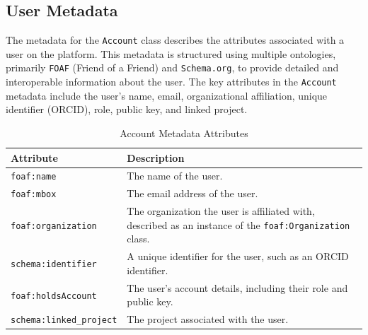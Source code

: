 \documentclass[final]{rc-book-2.14}
\begin{document}
\subsection{User Metadata}

The metadata for the \texttt{Account} class describes the attributes associated with a user on the platform. This metadata is structured using multiple ontologies, primarily \texttt{FOAF} (Friend of a Friend) and \texttt{Schema.org}, to provide detailed and interoperable information about the user. The key attributes in the \texttt{Account} metadata include the user's name, email, organizational affiliation, unique identifier (ORCID), role, public key, and linked project.

\begin{table}[h]
    \centering
    \renewcommand{\arraystretch}{1.2}
    \begin{tabularx}{\textwidth}{|l|X|}
        \hline
        \textbf{Attribute}              & \textbf{Description}                                                                                            \\ \hline
        \texttt{foaf:name}              & The name of the user.                                                                                           \\ \hline
        \texttt{foaf:mbox}              & The email address of the user.                                                                                  \\ \hline
        \texttt{foaf:organization}      & The organization the user is affiliated with, described as an instance of the \texttt{foaf:Organization} class. \\ \hline
        \texttt{schema:identifier}      & A unique identifier for the user, such as an ORCID identifier.                                                  \\ \hline
        \texttt{foaf:holdsAccount}      & The user's account details, including their role and public key.                                                \\ \hline
        \texttt{schema:linked\_project} & The project associated with the user.                                                                           \\ \hline
    \end{tabularx}
    \caption{Account Metadata Attributes}
    \label{tab:user_metadata}
\end{table}
\end{document}
